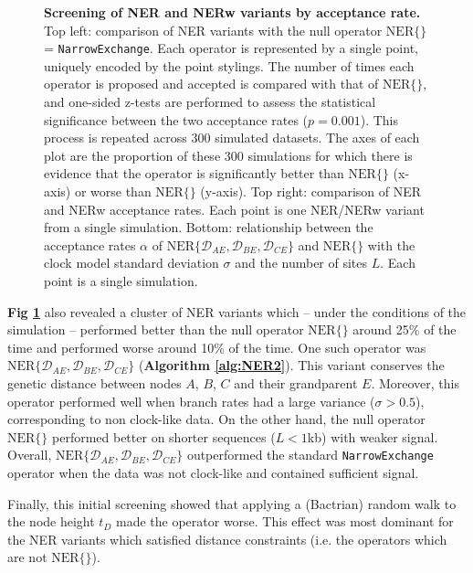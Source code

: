 \documentclass[10pt,letterpaper]{article}
\begin{document}
\begin{figure}[!h]
\caption{\textbf{Screening of NER and NERw variants by acceptance rate.} Top left: comparison of NER variants with the null operator $\text{NER}\{\}$ = \texttt{NarrowExchange}. 
Each operator is represented by a single point, uniquely encoded by the point stylings. 
The number of times each operator is proposed and accepted is compared with that of $\text{NER}\{\}$, and one-sided z-tests are performed to assess the statistical significance between the two acceptance rates ($p = 0.001$).  This process is repeated across $300$ simulated datasets. The axes of each plot are the proportion of these $300$ simulations for which there is evidence that the operator is significantly better than $\text{NER}\{\}$ (x-axis) or worse than $\text{NER}\{\}$ (y-axis). Top right: comparison of NER and NERw acceptance rates. Each point is one NER/NERw variant from a single simulation. Bottom: relationship between the acceptance rates $\alpha$ of $\text{NER}\{\mathcal{D}_{AE}, \mathcal{D}_{BE}, \mathcal{D}_{CE}\}$ and $\text{NER}\{ \}$ with the clock model standard deviation $\sigma$ and the number of sites $L$.  Each point is a single simulation. }
\label{fig:acceptanceRateScreening}
\end{figure}





\textbf{Fig \ref{fig:acceptanceRateScreening}} also revealed a cluster of NER variants which -- under the conditions of the simulation --  performed better than the null operator $\text{NER}\{\}$ around 25\% of the time and performed worse around 10\% of the time. 
One such operator was  $\text{NER}\{\mathcal{D}_{AE}, \mathcal{D}_{BE}, \mathcal{D}_{CE}\}$  (\textbf{Algorithm \ref{alg:NER2}}). 
This variant conserves the genetic distance between nodes $A$, $B$, $C$ and their grandparent $E$. 
Moreover, this operator performed well when branch rates had a large variance ($\sigma > 0.5$), corresponding to non clock-like data. 
On the other hand, the null operator $\text{NER}\{\}$ performed better on shorter sequences ($L < 1$kb) with weaker signal.  
Overall, $\text{NER}\{\mathcal{D}_{AE}, \mathcal{D}_{BE}, \mathcal{D}_{CE}\}$ outperformed the standard \texttt{NarrowExchange} operator when the data was not clock-like and contained sufficient signal. 



Finally, this initial screening showed that applying a (Bactrian) random walk to the node height $t_D$ made the operator worse.
This effect was most dominant for the NER variants which satisfied distance constraints (i.e. the operators which are not $\text{NER}\{\}$).
\end{document}
